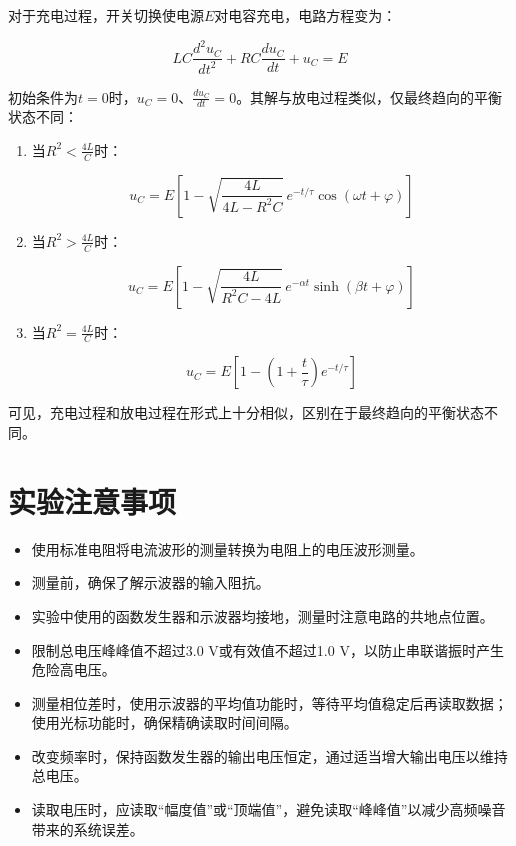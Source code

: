 \documentclass[a4paper,10pt]{article}
\begin{document}
对于充电过程，开关切换使电源\( E \)对电容充电，电路方程变为：

\[
LC \frac{d^2u_C}{dt^2} + RC \frac{du_C}{dt} + u_C = E
\]

初始条件为\( t = 0 \)时，\( u_C = 0 \)、\( \frac{du_C}{dt} = 0 \)。其解与放电过程类似，仅最终趋向的平衡状态不同：

\begin{enumerate}
    \item 当\( R^2 < \frac{4L}{C} \)时：

    \[
    u_C = E \left[1 - \sqrt{\frac{4L}{4L - R^2C}} \, e^{-t/\tau} \cos(\omega t + \varphi)\right]
    \]

    \item 当\( R^2 > \frac{4L}{C} \)时：

    \[
    u_C = E \left[1 - \sqrt{\frac{4L}{R^2C - 4L}} \, e^{-\alpha t} \sinh(\beta t + \varphi)\right]
    \]

    \item 当\( R^2 = \frac{4L}{C} \)时：

    \[
    u_C = E \left[1 - \left(1 + \frac{t}{\tau}\right) e^{-t/\tau}\right]
    \]
\end{enumerate}

可见，充电过程和放电过程在形式上十分相似，区别在于最终趋向的平衡状态不同。

\section{实验注意事项}

\begin{itemize}
    \item 使用标准电阻将电流波形的测量转换为电阻上的电压波形测量。
    \item 测量前，确保了解示波器的输入阻抗。
    \item 实验中使用的函数发生器和示波器均接地，测量时注意电路的共地点位置。
    \item 限制总电压峰峰值不超过3.0 V或有效值不超过1.0 V，以防止串联谐振时产生危险高电压。
    \item 测量相位差时，使用示波器的平均值功能时，等待平均值稳定后再读取数据；使用光标功能时，确保精确读取时间间隔。
    \item 改变频率时，保持函数发生器的输出电压恒定，通过适当增大输出电压以维持总电压。
    \item 读取电压时，应读取“幅度值”或“顶端值”，避免读取“峰峰值”以减少高频噪音带来的系统误差。
\end{itemize}
\end{document}
